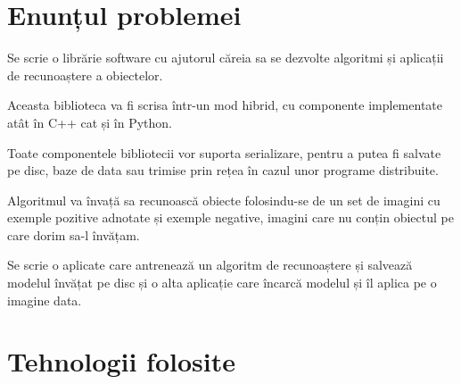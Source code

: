 















\section{Enunțul problemei}
Se scrie o librărie software cu ajutorul căreia sa se dezvolte algoritmi și aplicații de recunoaștere a obiectelor.

Aceasta biblioteca va fi scrisa într-un mod hibrid, cu componente implementate atât în C++ cat și în Python.

Toate componentele bibliotecii vor suporta serializare, pentru a putea fi salvate pe disc, baze de data sau trimise prin rețea în cazul unor programe distribuite.

Algoritmul va învață sa recunoască obiecte folosindu-se de un set de imagini cu exemple pozitive adnotate și exemple negative, imagini care nu conțin obiectul pe care dorim sa-l învățam.

Se scrie o aplicate care antrenează un algoritm de recunoaștere și salvează modelul învățat pe disc și o alta aplicație care încarcă modelul și îl aplica pe o imagine data.

\pagebreak
\section{Tehnologii folosite}

